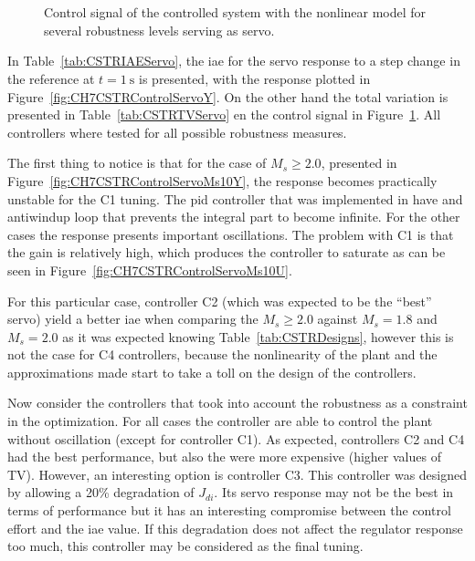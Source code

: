 %
%
\begin{figure}
	\centering
	\\
	\\
	\caption{Control signal of the controlled system with the nonlinear model for several robustness levels serving as servo.}
	\label{fig:CH7CSTRControlServoU}
\end{figure}
%
In Table~\ref{tab:CSTRIAEServo}, the \gls{iae} for the servo response to a step change in the reference at $t= \SI{1}{\second}$ is presented, with the response  plotted in Figure~\ref{fig:CH7CSTRControlServoY}. On the other hand the total variation is presented in Table~\ref{tab:CSTRTVServo} en the control signal in Figure~\ref{fig:CH7CSTRControlServoU}. All controllers where tested for all possible robustness measures.

The first thing to notice is that for the case of $M_s \geq 2.0$, presented in Figure~\ref{fig:CH7CSTRControlServoMs10Y}, the response becomes practically unstable for the C1 tuning. The \gls{pid} controller that was implemented in \simulink have and antiwindup loop that prevents the integral part to become infinite. For the other cases the response presents important oscillations. The problem with C1 is that the gain is relatively high, which produces the controller to saturate as can be seen in Figure~\ref{fig:CH7CSTRControlServoMs10U}.

For this particular case, controller C2 (which was expected to be the ``best'' servo) yield a better \gls{iae} when comparing the $M_s \geq 2.0$ against $M_s = 1.8$ and $M_s = 2.0$ as it was expected knowing Table~\ref{tab:CSTRDesigns}, however this is not the case for C4 controllers, because the nonlinearity of the plant and the approximations made start to take a toll on the design of the controllers.

Now consider the controllers that took into account the robustness as a constraint in the optimization. For all cases the controller are able to control the plant without oscillation (except for controller C1). As expected, controllers C2 and C4 had the best performance, but also the were more expensive (higher values of TV). However, an interesting option is controller C3. This controller was designed by allowing a 20\% degradation of $J_{di}$. Its servo response may not be the best in terms of performance but it has an interesting compromise between the control effort and the \gls{iae} value. If this degradation does not affect the regulator response too much, this controller may be considered as the final tuning.

